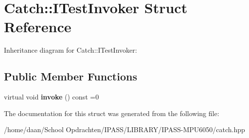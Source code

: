\hypertarget{structCatch_1_1ITestInvoker}{}\section{Catch\+:\+:I\+Test\+Invoker Struct Reference}
\label{structCatch_1_1ITestInvoker}


Inheritance diagram for Catch\+:\+:I\+Test\+Invoker\+:
\subsection*{Public Member Functions}
\begin{DoxyCompactItemize}
\item 
\mbox{\label{structCatch_1_1ITestInvoker_a6fcd5c5b67d6d5ade6491ff33411ca7f}} 
virtual void {\bfseries invoke} () const =0
\end{DoxyCompactItemize}


The documentation for this struct was generated from the following file\+:\begin{DoxyCompactItemize}
\item 
/home/daan/\+School Opdrachten/\+I\+P\+A\+S\+S/\+L\+I\+B\+R\+A\+R\+Y/\+I\+P\+A\+S\+S-\/\+M\+P\+U6050/catch.\+hpp\end{DoxyCompactItemize}
